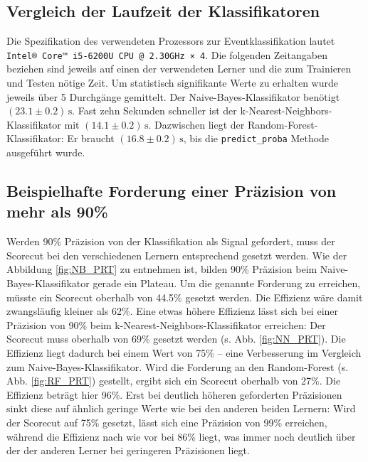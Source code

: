 \subsection{Vergleich der Laufzeit der Klassifikatoren}

Die Spezifikation des verwendeten Prozessors zur Eventklassifikation lautet \texttt{Intel® Core™ i5-6200U CPU @ 2.30GHz × 4}. Die folgenden Zeitangaben beziehen sind jeweils auf einen der verwendeten Lerner und die zum Trainieren und Testen nötige Zeit. Um statistisch signifikante Werte zu erhalten wurde jeweils über 5 Durchgänge gemittelt. Der Naive-Bayes-Klassifikator benötigt $(23.1 \pm 0.2) \,\text{s}$. Fast zehn Sekunden schneller ist der k-Nearest-Neighbors-Klassifikator mit $(14.1 \pm 0.2) \,\text{s}$. Dazwischen liegt der Random-Forest-Klassifikator: Er braucht $(16.8 \pm 0.2) \,\text{s}$, bis die \texttt{predict\_proba} Methode ausgeführt wurde.

\subsection{Beispielhafte Forderung einer Präzision von mehr als 90\%}

Werden 90\% Präzision von der Klassifikation als Signal gefordert, muss der Scorecut bei den verschiedenen Lernern entsprechend gesetzt werden. Wie der Abbildung \ref{fig:NB_PRT} zu entnehmen ist, bilden 90\% Präzision beim Naive-Bayes-Klassifikator gerade ein Plateau. Um die genannte Forderung zu erreichen, müsste ein Scorecut oberhalb von 44.5\% gesetzt werden. Die Effizienz wäre damit zwangsläufig kleiner als 62\%. Eine etwas höhere Effizienz lässt sich bei einer Präzision von 90\% beim k-Nearest-Neighbors-Klassifikator erreichen: Der Scorecut muss oberhalb von 69\% gesetzt werden (s. Abb. \ref{fig:NN_PRT}). Die Effizienz liegt dadurch bei einem Wert von 75\% -- eine Verbesserung im Vergleich zum Naive-Bayes-Klassifikator. Wird die Forderung an den Random-Forest (s. Abb. \ref{fig:RF_PRT}) gestellt, ergibt sich ein Scorecut oberhalb von 27\%. Die Effizienz beträgt hier 96\%. Erst bei deutlich höheren geforderten Präzisionen sinkt diese auf ähnlich geringe Werte wie bei den anderen beiden Lernern: Wird der Scorecut auf 75\% gesetzt, lässt sich eine Präzision von 99\% erreichen, während die Effizienz nach wie vor bei 86\% liegt, was immer noch deutlich über der der anderen Lerner bei geringeren Präzisionen liegt.